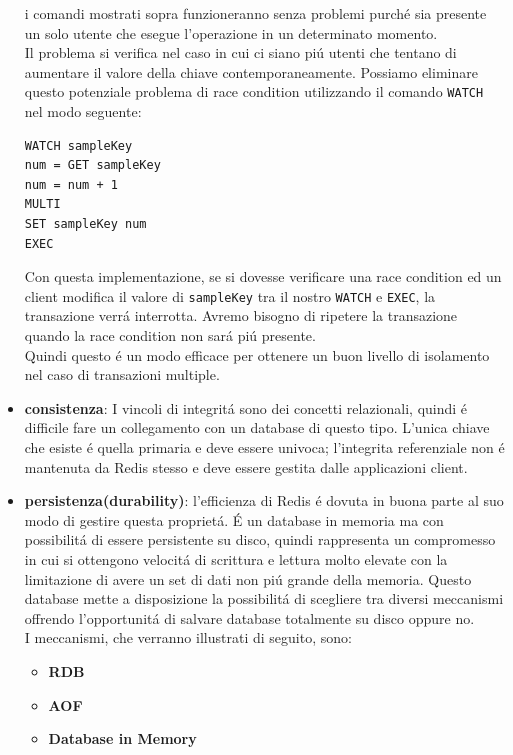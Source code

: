 \begin{itemize}
    i comandi mostrati sopra funzioneranno senza problemi purché sia presente un solo utente che esegue l'operazione in un determinato momento.\\
    Il problema si verifica nel caso in cui ci siano piú utenti che tentano di aumentare il valore della chiave contemporaneamente.
    Possiamo eliminare questo potenziale problema di race condition utilizzando il comando \texttt{WATCH} nel modo seguente:

    \begin{lstlisting}[autogobble]
WATCH sampleKey
num = GET sampleKey
num = num + 1
MULTI
SET sampleKey num
EXEC\end{lstlisting}

    Con questa implementazione, se si dovesse verificare una race condition ed un client modifica il valore di \texttt{sampleKey} tra il nostro
    \texttt{WATCH} e \texttt{EXEC}, la transazione verrá interrotta. Avremo bisogno di ripetere la transazione quando la race condition non sará
    piú presente.\\
    Quindi questo é un modo efficace per ottenere un buon livello di isolamento nel caso di transazioni multiple.

    \item \textbf{consistenza}: I vincoli di integritá sono dei concetti relazionali, quindi é difficile fare un collegamento con un database di questo tipo.
    L'unica chiave che esiste é quella primaria e deve essere univoca;
    l'integrita referenziale non é mantenuta da Redis stesso e deve essere gestita dalle applicazioni client.

    \item \textbf{persistenza(durability)}:
    l'efficienza di Redis é dovuta in buona parte al suo modo di gestire questa proprietá.
    É un database in memoria ma con possibilitá di essere persistente su disco, quindi rappresenta un compromesso in cui si ottengono
    velocitá di scrittura e lettura molto elevate con la limitazione di avere un set di dati non piú grande della memoria.
    Questo database mette a disposizione la possibilitá di scegliere tra diversi meccanismi
    offrendo l'opportunitá di salvare database
    totalmente su disco oppure no.\\
    I meccanismi, che verranno illustrati di seguito, sono:
      \begin{itemize}
          \item \textbf{RDB}
          \item \textbf{AOF}
          \item \textbf{Database in Memory}
      \end{itemize}%
        

\end{itemize}
